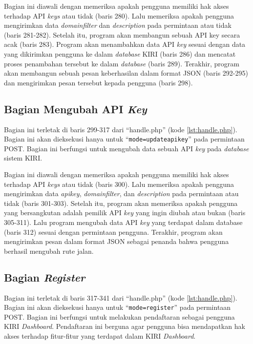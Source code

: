 Bagian ini diawali dengan memeriksa apakah pengguna memiliki hak akses terhadap API \textit{keys} atau tidak (baris 280). Lalu memeriksa apakah pengguna mengirimkan data \textit{domainfilter} dan \textit{description} pada permintaan atau tidak (baris 281-282). Setelah itu, program akan membangun sebuah API key secara acak (baris 283). Program akan menambahkan data API \textit{key} sesuai dengan data yang dikirimkan pengguna ke dalam \textit{database} KIRI (baris 286) dan mencatat proses penambahan tersebut ke dalam \textit{database} (baris 289). Terakhir, program akan membangun sebuah pesan keberhasilan dalam format JSON (baris 292-295) dan mengirimkan pesan tersebut kepada pengguna (baris 298).

\subsection{Bagian Mengubah API \textit{Key}}
\label{sec:ubahapikey}
Bagian ini terletak di baris 299-317 dari ``handle.php'' (kode \ref{lst:handle.php}). Bagian ini akan dieksekusi hanya untuk ``\texttt{mode=updateapikey}'' pada permintaan POST. Bagian ini berfungsi untuk mengubah data sebuah API \textit{key} pada \textit{database} sistem KIRI.

Bagian ini diawali dengan memeriksa apakah pengguna memiliki hak akses terhadap API \textit{keys} atau tidak (baris 300). Lalu memeriksa apakah pengguna mengirimkan data \textit{apikey}, \textit{domainfilter}, dan \textit{description} pada permintaan atau tidak (baris 301-303). Setelah itu, program akan memeriksa apakah pengguna yang bersangkutan adalah pemilik API \textit{key} yang ingin diubah atau bukan (baris 305-311). Lalu program mengubah data API \textit{key} yang terdapat dalam database (baris 312) sesuai dengan permintaan pengguna. Terakhir, program akan mengirimkan pesan dalam format JSON sebagai penanda bahwa pengguna berhasil mengubah rute jalan.

\subsection{Bagian \textit{Register}}
\label{sec:bagianregister}
Bagian ini terletak di baris 317-341 dari ``handle.php'' (kode \ref{lst:handle.php}). Bagian ini akan dieksekusi hanya untuk ``\texttt{mode=register}'' pada permintaan POST. Bagian ini berfungsi untuk melakukan pendaftaran sebagai pengguna KIRI \textit{Dashboard}. Pendaftaran ini berguna agar pengguna bisa mendapatkan hak akses terhadap fitur-fitur yang terdapat dalam KIRI \textit{Dashboard}.

